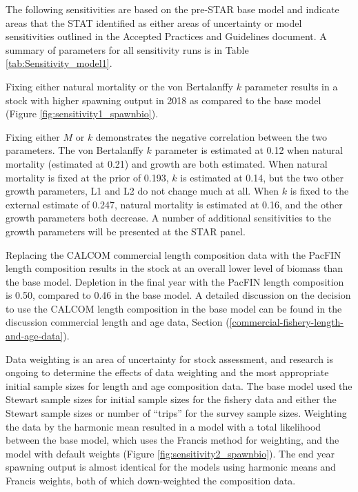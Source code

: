 \documentclass[12pt,]{article}
\begin{document}
The following sensitivities are based on the pre-STAR base model and
indicate areas that the STAT identified as either areas of uncertainty
or model sensitivities outlined in the Accepted Practices and Guidelines
document. A summary of parameters for all sensitivity runs is in Table
\ref{tab:Sensitivity_model1}.

Fixing either natural mortality or the von Bertalanffy \(k\) parameter
results in a stock with higher spawning output in 2018 as compared to
the base model (Figure \ref{fig:sensitivity1_spawnbio}).

Fixing either \(M\) or \(k\) demonstrates the negative correlation
between the two parameters. The von Bertalanffy \(k\) parameter is
estimated at 0.12 when natural mortality (estimated at 0.21) and growth
are both estimated. When natural mortality is fixed at the prior of
0.193, \(k\) is estimated at 0.14, but the two other growth parameters,
L1 and L2 do not change much at all. When \(k\) is fixed to the external
estimate of 0.247, natural mortality is estimated at 0.16, and the other
growth parameters both decrease. A number of additional sensitivities to
the growth parameters will be presented at the STAR panel.

Replacing the CALCOM commercial length composition data with the PacFIN
length composition results in the stock at an overall lower level of
biomass than the base model. Depletion in the final year with the PacFIN
length composition is 0.50, compared to 0.46 in the base model. A
detailed discussion on the decision to use the CALCOM length composition
in the base model can be found in the discussion commercial length and
age data, Section (\ref{commercial-fishery-length-and-age-data}).

Data weighting is an area of uncertainty for stock assessment, and
research is ongoing to determine the effects of data weighting and the
most appropriate initial sample sizes for length and age composition
data. The base model used the Stewart sample sizes for initial sample
sizes for the fishery data and either the Stewart sample sizes or number
of ``trips'' for the survey sample sizes. Weighting the data by the
harmonic mean resulted in a model with a total likelihood between the
base model, which uses the Francis method for weighting, and the model
with default weights (Figure \ref{fig:sensitivity2_spawnbio}). The end
year spawning output is almost identical for the models using harmonic
means and Francis weights, both of which down-weighted the composition
data.
\end{document}
